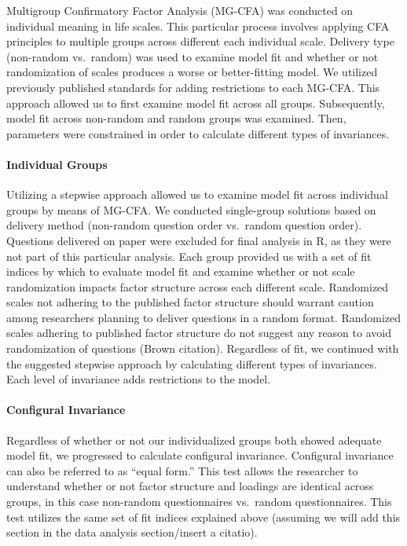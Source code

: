 \documentclass[man,draftall]{apa6}
\let\oldparagraph\paragraph
\renewcommand{\paragraph}[1]{\oldparagraph{#1}\mbox{}}
\begin{document}
Multigroup Confirmatory Factor Analysis (MG-CFA) was conducted on individual meaning in life scales. This particular process involves applying CFA principles to multiple groups across different each individual scale. Delivery type (non-random vs.~random) was used to examine model fit and whether or not randomization of scales produces a worse or better-fitting model. We utilized previously published standards for adding restrictions to each MG-CFA. This approach allowed us to first examine model fit across all groups. Subsequently, model fit across non-random and random groups was examined. Then, parameters were constrained in order to calculate different types of invariances.

\hypertarget{individual-groups}{%
\paragraph{Individual Groups}\label{individual-groups}}

Utilizing a stepwise approach allowed us to examine model fit across individual groups by means of MG-CFA. We conducted single-group solutions based on delivery method (non-random question order vs.~random question order). Questions delivered on paper were excluded for final analysis in R, as they were not part of this particular analysis. Each group provided us with a set of fit indices by which to evaluate model fit and examine whether or not scale randomization impacts factor structure across each different scale. Randomized scales not adhering to the published factor structure should warrant caution among researchers planning to deliver questions in a random format. Randomized scales adhering to published factor structure do not suggest any reason to avoid randomization of questions (Brown citation). Regardless of fit, we continued with the suggested stepwise approach by calculating different types of invariances. Each level of invariance adds restrictions to the model.

\hypertarget{configural-invariance}{%
\paragraph{Configural Invariance}\label{configural-invariance}}

Regardless of whether or not our individualized groups both showed adequate model fit, we progressed to calculate configural invariance. Configural invariance can also be referred to as \enquote{equal form.} This test allows the researcher to understand whether or not factor structure and loadings are identical across groups, in this case non-random questionnaires vs.~random questionnaires. This test utilizes the same set of fit indices explained above (assuming we will add this section in the data analysis section/insert a citatio).
\end{document}

